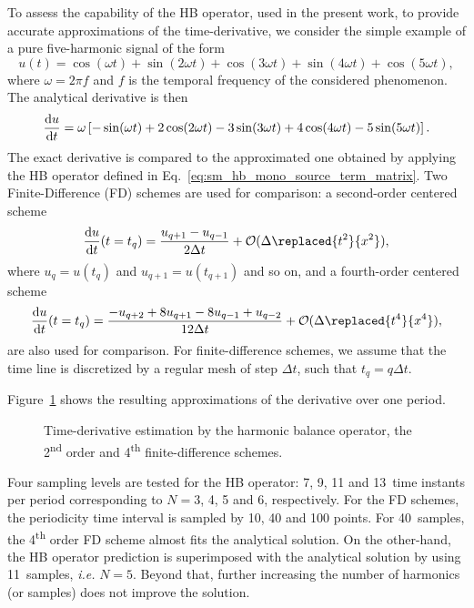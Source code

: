 To assess the capability of the HB operator, used in the present work, to
provide accurate approximations of the time-derivative, 
we consider the simple example of a pure
five-harmonic signal of the form
\begin{equation}
    \label{eq:sum_sin}
    u(t) = \cos(\omega t) + \sin(2 \omega t) +
    \cos(3 \omega t) + \sin(4 \omega t) + \cos(5 \omega t),
\end{equation}
where $\omega = 2 \pi f$ and $f$ is the temporal frequency of
the considered phenomenon.
The analytical derivative is then
\begin{equation}
    \label{eq:sum_sin_deriv}
    \frac{\diff u}{\diff t} = 
    \omega\left[ -\sin(\omega t) + 
    2\cos(2 \omega t) -
    3\sin(3 \omega t) + 
    4\cos(4 \omega t) -
    5\sin(5 \omega t)\right].
\end{equation}
The exact derivative is compared to the approximated one obtained by applying 
the HB operator defined in Eq.~\eqref{eq:sm_hb_mono_source_term_matrix}.
Two Finite-Difference (FD) schemes are used for comparison:
a second-order centered scheme
\begin{equation}
    \frac{\diff u}{\diff t} (t=t_q) =
    \frac{u_{q+1} - u_{q-1}}{2 \Delta t} + \mathcal{O} (\Delta \replaced{t^2}{x^2}),
    \label{eq:hb_op_center2}
\end{equation}
where $u_q = u(t_q)$ and $u_{q + 1} = u(t_{q + 1})$ and so on,
and a fourth-order centered scheme
\begin{equation}
    \frac{\diff u}{\diff t} (t=t_q) =
    \frac{-u_{q+2} + 8 u_{q+1} - 8 u_{q-1} + u_{q-2}}{12\Delta t}
    + \mathcal{O} (\Delta \replaced{t^4}{x^4}),
    \label{eq:hb_op_center4}
\end{equation}
are also used for comparison.
For finite-difference schemes, 
we assume that the time line is discretized 
by a regular mesh of step $\Delta t$, such that $t_q = q \Delta t$.

Figure~\ref{fig:hb_operator_sample} shows the resulting approximations 
of the derivative over one period.
\begin{figure}[htp]
  \centering
  \caption{Time-derivative estimation by the harmonic balance operator,
  the 2\textsuperscript{nd} order and 4\textsuperscript{th} finite-difference schemes.}
  \label{fig:hb_operator_sample}
\end{figure}
Four sampling levels
are tested for the HB operator: 7, 9, 11 and 13~time instants per period
corresponding to $N=3$, 4, 5 and 6, respectively.
For the FD schemes, the periodicity time interval is sampled by
10, 40 and 100 points.
For 40~samples, the 4\textsuperscript{th} order FD
scheme almost fits the analytical solution. On the other-hand,
the HB operator prediction is superimposed with the analytical solution
by using 11~samples, \emph{i.e.} $N=5$. Beyond that, further increasing the
number of harmonics (or samples)
does not improve the solution.

